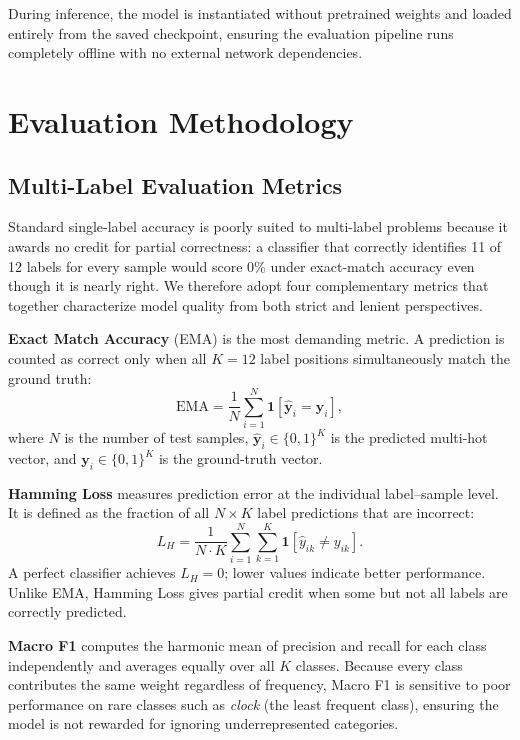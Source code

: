 \documentclass[10pt]{article}
\begin{document}
During inference, the model is instantiated without pretrained weights and loaded entirely from
the saved checkpoint, ensuring the evaluation pipeline runs completely offline with no external
network dependencies.


\section{Evaluation Methodology}

\subsection*{Multi-Label Evaluation Metrics}

Standard single-label accuracy is poorly suited to multi-label problems because it awards no
credit for partial correctness: a classifier that correctly identifies 11 of 12 labels for every
sample would score 0\% under exact-match accuracy even though it is nearly right.  We therefore
adopt four complementary metrics that together characterize model quality from both strict and
lenient perspectives.

\textbf{Exact Match Accuracy} (EMA) is the most demanding metric.  A prediction is counted as
correct only when all $K = 12$ label positions simultaneously match the ground truth:
\begin{equation}
    \text{EMA} = \frac{1}{N} \sum_{i=1}^{N}
        \mathbf{1}\!\left[\hat{\mathbf{y}}_i = \mathbf{y}_i\right],
    \label{eq:ema}
\end{equation}
where $N$ is the number of test samples, $\hat{\mathbf{y}}_i \in \{0,1\}^{K}$ is the predicted
multi-hot vector, and $\mathbf{y}_i \in \{0,1\}^{K}$ is the ground-truth vector.

\textbf{Hamming Loss} measures prediction error at the individual label--sample level.  It is
defined as the fraction of all $N \times K$ label predictions that are incorrect:
\begin{equation}
    L_H = \frac{1}{N \cdot K}
          \sum_{i=1}^{N} \sum_{k=1}^{K}
          \mathbf{1}\!\left[\hat{y}_{ik} \neq y_{ik}\right].
    \label{eq:hamming}
\end{equation}
A perfect classifier achieves $L_H = 0$; lower values indicate better performance.  Unlike EMA,
Hamming Loss gives partial credit when some but not all labels are correctly predicted.

\textbf{Macro F1} computes the harmonic mean of precision and recall for each class independently
and averages equally over all $K$ classes.  Because every class contributes the same weight
regardless of frequency, Macro F1 is sensitive to poor performance on rare classes such as
\textit{clock} (the least frequent class), ensuring the model is not rewarded for ignoring
underrepresented categories.
\end{document}
